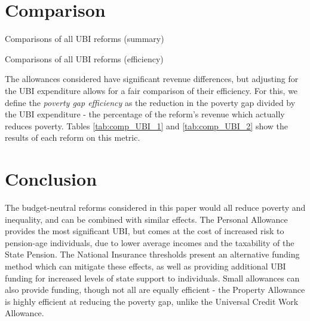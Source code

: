 \documentclass{article}
\begin{document}
    \section{Comparison}

    \begin{table}[h]
        \centering
        
        \caption{Comparisons of all UBI reforms (summary)}
        \label{tab:comp_UBI_1}
    \end{table}

    \begin{table}[h]
        \centering
        
        \caption{Comparisons of all UBI reforms (efficiency)}
        \label{tab:comp_UBI_2}
    \end{table}
    The allowances considered have significant revenue differences, but adjusting for the UBI expenditure allows for a fair comparison of their efficiency. For this, we define the \emph{poverty gap efficiency} as the reduction in the poverty gap divided by the UBI expenditure - the percentage of the reform's revenue which actually reduces poverty. Tables \ref{tab:comp_UBI_1} and \ref{tab:comp_UBI_2} show the results of each reform on this metric.
    \section{Conclusion}
    The budget-neutral reforms considered in this paper would all reduce poverty and inequality, and can be combined with similar effects. The Personal Allowance provides the most significant UBI, but comes at the cost of increased risk to pension-age individuals, due to lower average incomes and the taxability of the State Pension. The National Insurance thresholds present an alternative funding method which can mitigate these effects, as well as providing additional UBI funding for increased levels of state support to individuals. Small allowances can also provide funding, though not all are equally efficient - the Property Allowance is highly efficient at reducing the poverty gap, unlike the Universal Credit Work Allowance.
\end{document}
